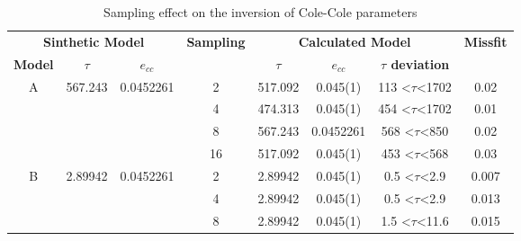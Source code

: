 \documentclass{vie16}
\begin{document}
\begin{table}[h!]
\centering
\caption{Sampling effect on the inversion of Cole-Cole parameters}
\label{my-label}
\begin{tabular}{@{}|c|c|c|c|c|c|c|c|@{}}
\multicolumn{3}{|c|}{\textbf{Sinthetic Model}}                             & \multirow{2}{*}{\textbf{Sampling}} & \multicolumn{3}{c|}{\textbf{Calculated Model}}                          & \multirow{2}{*}{\textbf{Missfit}}    \\
\textbf{Model}     & \textbf{$\tau$}          & \textbf{$e_{cc}$}          &                                    & \textbf{$\tau$} & \textbf{$e_{cc}$} & \textbf{$\tau$ deviation}         &                                      \\ \hline
\multirow{4}{*}{A} & \multirow{4}{*}{567.243} & \multirow{4}{*}{0.0452261} & 2                                  & 517.092         & 0.045(1)          & 113 \textless$\tau$\textless 1702 & 0.02                                 \\
                   &                          &                            & 4                                  & 474.313         & 0.045(1)          & 454 \textless$\tau$\textless 1702 & 0.01                                 \\
                   &                          &                            & 8                                  & 567.243         & 0.0452261         & 568 \textless$\tau$\textless 850  & 0.02                                 \\
                   &                          &                            & 16                                 & 517.092         & 0.045(1)          & 453 \textless$\tau$\textless 568  & 0.03                                 \\ \hline
\multirow{4}{*}{B} & \multirow{4}{*}{2.89942} & \multirow{4}{*}{0.0452261} & 2                                  & 2.89942         & 0.045(1)          & 0.5 \textless$\tau$\textless 2.9  & 0.007                                \\
                   &                          &                            & 4                                  & 2.89942         & 0.045(1)          & 0.5 \textless$\tau$\textless 2.9  & 0.013                                \\
                   &                          &                            & 8                                  & 2.89942         & 0.045(1)          & 1.5 \textless$\tau$\textless 11.6 & 0.015                                \\

\end{tabular}
\end{table}
\end{document}
